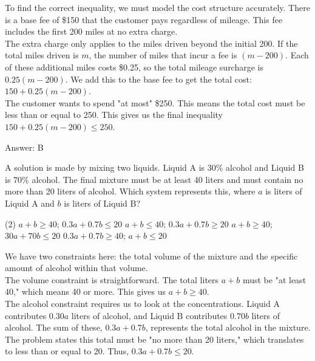 \documentclass[11pt,paper=a4,answers]{exam}
\begin{document}
\begin{questions}
\begin{solution}
To find the correct inequality, we must model the cost structure accurately. There is a base fee of \$150 that the customer pays regardless of mileage. This fee includes the first 200 miles at no extra charge.
\\[10pt]
The extra charge only applies to the miles driven beyond the initial 200. If the total miles driven is $m$, the number of miles that incur a fee is $(m - 200)$. Each of these additional miles costs \$0.25, so the total mileage surcharge is $0.25(m - 200)$. We add this to the base fee to get the total cost: $150 + 0.25(m - 200)$.
\\[10pt]
The customer wants to spend "at most" \$250. This means the total cost must be less than or equal to 250. This gives us the final inequality $150 + 0.25(m - 200) \leq 250$.

\vspace{15pt}
Answer: \colorbox{yellow!100}{B}
\end{solution}

\question
A solution is made by mixing two liquids. Liquid A is 30\% alcohol and Liquid B is 70\% alcohol. The final mixture must be at least 40 liters and must contain no more than 20 liters of alcohol. Which system represents this, where $a$ is liters of Liquid A and $b$ is liters of Liquid B?
\begin{tasks}(2)
    \task $a + b \geq 40$; $0.3a + 0.7b \leq 20$
    \task $a + b \leq 40$; $0.3a + 0.7b \geq 20$
    \task $a + b \geq 40$; $30a + 70b \leq 20$
    \task $0.3a + 0.7b \geq 40$; $a + b \leq 20$
\end{tasks}

\begin{solution}
We have two constraints here: the total volume of the mixture and the specific amount of alcohol within that volume.
\\[10pt]
The volume constraint is straightforward. The total liters $a + b$ must be "at least 40," which means 40 or more. This gives us $a + b \geq 40$.
\\[10pt]
The alcohol constraint requires us to look at the concentrations. Liquid A contributes $0.30a$ liters of alcohol, and Liquid B contributes $0.70b$ liters of alcohol. The sum of these, $0.3a + 0.7b$, represents the total alcohol in the mixture. The problem states this total must be "no more than 20 liters," which translates to less than or equal to 20. Thus, $0.3a + 0.7b \leq 20$. 


\end{solution}
\end{questions}
\end{document}
